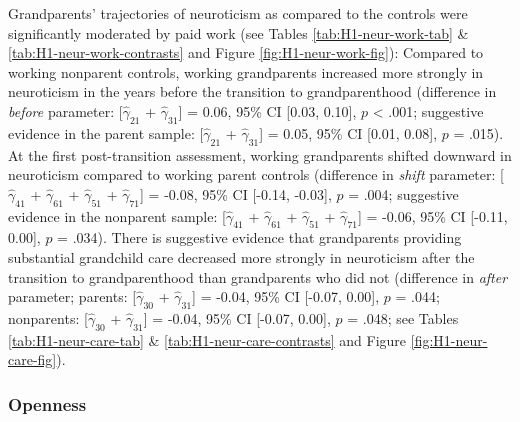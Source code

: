 \documentclass[
  english,
  man, noextraspace]{apa7}
\begin{document}
Grandparents' trajectories of neuroticism as compared to the controls were significantly moderated by paid work (see Tables \ref{tab:H1-neur-work-tab} \& \ref{tab:H1-neur-work-contrasts} and Figure \ref{fig:H1-neur-work-fig}): Compared to working nonparent controls, working grandparents increased more strongly in neuroticism in the years before the transition to grandparenthood (difference in \emph{before} parameter: {[}\(\hat{\gamma}_{21}\) + \(\hat{\gamma}_{31}\){]} = 0.06, 95\% CI {[}0.03, 0.10{]}, \(p\) \textless{} .001; suggestive evidence in the parent sample: {[}\(\hat{\gamma}_{21}\) + \(\hat{\gamma}_{31}\){]} = 0.05, 95\% CI {[}0.01, 0.08{]}, \(p\) = .015). At the first post-transition assessment, working grandparents shifted downward in neuroticism compared to working parent controls (difference in \emph{shift} parameter: {[}\(\hat{\gamma}_{41}\) + \(\hat{\gamma}_{61}\) + \(\hat{\gamma}_{51}\) + \(\hat{\gamma}_{71}\){]} = -0.08, 95\% CI {[}-0.14, -0.03{]}, \(p\) = .004; suggestive evidence in the nonparent sample: {[}\(\hat{\gamma}_{41}\) + \(\hat{\gamma}_{61}\) + \(\hat{\gamma}_{51}\) + \(\hat{\gamma}_{71}\){]} = -0.06, 95\% CI {[}-0.11, 0.00{]}, \(p\) = .034). There is suggestive evidence that grandparents providing substantial grandchild care decreased more strongly in neuroticism after the transition to grandparenthood than grandparents who did not (difference in \emph{after} parameter; parents: {[}\(\hat{\gamma}_{30}\) + \(\hat{\gamma}_{31}\){]} = -0.04, 95\% CI {[}-0.07, 0.00{]}, \(p\) = .044; nonparents: {[}\(\hat{\gamma}_{30}\) + \(\hat{\gamma}_{31}\){]} = -0.04, 95\% CI {[}-0.07, 0.00{]}, \(p\) = .048; see Tables \ref{tab:H1-neur-care-tab} \& \ref{tab:H1-neur-care-contrasts} and Figure \ref{fig:H1-neur-care-fig}).

\hypertarget{openness}{%
\subsubsection{Openness}\label{openness}}
\end{document}

